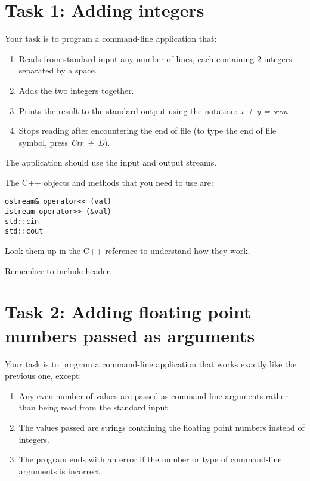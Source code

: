 \section{Task 1: Adding integers}

Your task is to program a command-line application that:
\begin{enumerate}
  \item Reads from standard input any number of lines, each containing 2 integers separated by a space.
  \item Adds the two integers together.
  \item Prints the result to the standard output using the notation: \emph{x + y = sum}.
  \item Stops reading after encountering the end of file (to type the end of file symbol, press \emph{Ctr~+~D}).
\end{enumerate}
The application should use the input and output streams. 

The C++ objects and methods that you need to use are:
\begin{verbatim}
ostream& operator<< (val)
istream operator>> (&val)
std::cin
std::cout
\end{verbatim}

Look them up in the C++ reference to understand how they work. 

Remember to include  header.

\section{Task 2: Adding floating point numbers passed as arguments}

Your task is to program a command-line application that works exactly like the previous one, except:
\begin{enumerate}
	\item Any even number of values are passed as command-line arguments rather than being read from the standard input.
	\item The values passed are strings containing the floating point numbers instead of integers.
	\item The program ends with an error if the number or type of command-line arguments is incorrect.
\end{enumerate}

